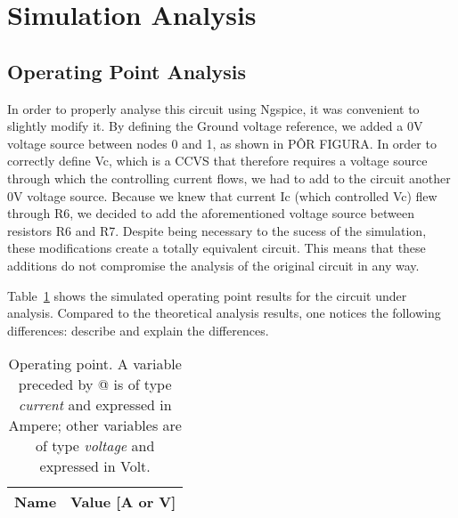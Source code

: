 \section{Simulation Analysis}
\label{sec:simulation}

\subsection{Operating Point Analysis}

In order to properly analyse this circuit using Ngspice, it was convenient to slightly modify it. By defining the Ground voltage reference, we added a 0V voltage source between nodes 0 and 1, as shown in PÔR FIGURA. In order to correctly define Vc, which is a CCVS that therefore requires a voltage source through which the controlling current flows, we had to add to the circuit another 0V voltage source. Because we knew that current Ic (which controlled Vc) flew through R6, we decided to add the aforementioned voltage source between resistors R6 and R7.
Despite being necessary to the sucess of the simulation, these modifications create a totally equivalent circuit. This means that these additions do not compromise the analysis of the original circuit in any way.


Table~\ref{tab:op} shows the simulated operating point results for the circuit
under analysis. Compared to the theoretical analysis results, one notices the
following differences: describe and explain the differences.

\begin{table}[h]
  \centering
  \begin{tabular}{|l|r|}
    \hline    
    {\bf Name} & {\bf Value [A or V]} \\ \hline
    
  \end{tabular}
  \caption{Operating point. A variable preceded by @ is of type {\em current}
    and expressed in Ampere; other variables are of type {\it voltage} and expressed in
    Volt.}
  \label{tab:op}
\end{table}



